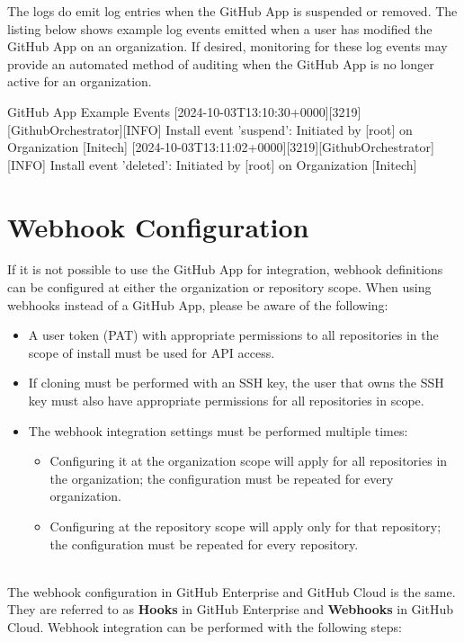 The \cxoneflow logs do emit log entries when the GitHub App is suspended or removed. The listing below shows example log events
emitted when a user has modified the GitHub App on an organization.  If desired, monitoring for these log events may provide
an automated method of auditing when the GitHub App is no longer active for an organization.

\begin{code}{GitHub App Example Events}{}{}
[2024-10-03T13:10:30+0000][3219][GithubOrchestrator][INFO] Install event 'suspend': Initiated by [root] on Organization [Initech]
[2024-10-03T13:11:02+0000][3219][GithubOrchestrator][INFO] Install event 'deleted': Initiated by [root] on Organization [Initech]
\end{code}

\section{Webhook Configuration}

If it is not possible to use the GitHub App for \cxoneflow integration, webhook definitions can be configured at either the
organization or repository scope.  When using webhooks instead of a GitHub App, please be aware of the following:

\begin{itemize}
    \item A user token (PAT) with appropriate permissions to all repositories in the scope of install must be used for API access.
    \item If cloning must be performed with an SSH key, the user that owns the SSH key must also have appropriate permissions for
    all repositories in scope.
    \item The webhook integration settings must be performed multiple times:
    \begin{itemize}
        \item Configuring it at the organization scope will apply for all repositories in the organization; the configuration must be repeated for
        every organization.
        \item Configuring at the repository scope will apply only for that repository; the configuration must be repeated for every
        repository.
    \end{itemize}
\end{itemize}

\noindent\\The webhook configuration in GitHub Enterprise and GitHub Cloud is the same.  They are referred to as \textbf{Hooks} in
GitHub Enterprise and \textbf{Webhooks} in GitHub Cloud.  Webhook integration can be performed with the following steps:

